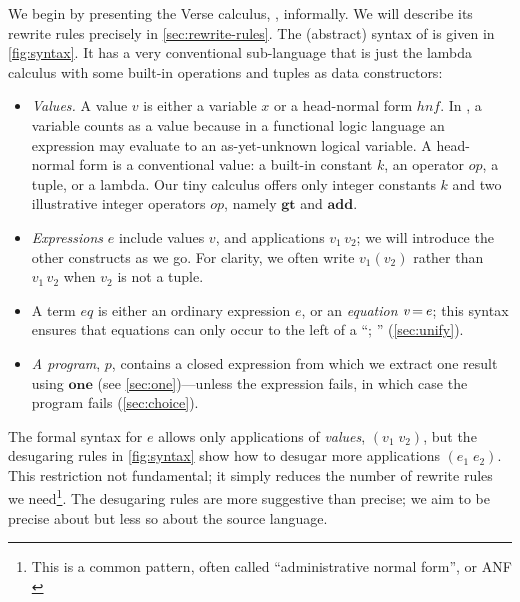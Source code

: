 \documentclass[acmsmall]{acmart}
\newcommand{\Varid}[1]{\mathit{#1}}
\newcommand{\lennart}[1]{{\color{dkcyan} [{LA}: #1]}}
\newcommand{\lennart}[1]{}
\begin{document}
We begin by presenting the Verse calculus, \versecalc, informally.  We will describe its
rewrite rules precisely in \cref{sec:rewrite-rules}.
The (abstract) syntax of \versecalc{} is given in \cref{fig:syntax}.
It has a very conventional sub-language that is just the lambda calculus with
some built-in operations and tuples as data constructors:
\begin{itemize}
\item \emph{Values.}  A value \ensuremath{\Varid{v}} is either a variable \ensuremath{\Varid{x}} or a head-normal form \ensuremath{\mathit{hnf}}.
  In \versecalc{}, a variable counts as a value because in a functional logic language an expression
  may evaluate to an as-yet-unknown logical variable.
  A head-normal form is a conventional value: a built-in constant \ensuremath{\Varid{k}}, an operator \ensuremath{\Varid{op}}, a tuple, or
  a lambda.  Our tiny calculus offers only integer constants \ensuremath{\Varid{k}} and two illustrative integer operators \ensuremath{\Varid{op}}, namely \ensuremath{\textbf{gt}} and \ensuremath{\textbf{add}}.
\item \emph{Expressions} \ensuremath{\Varid{e}} include values \ensuremath{\Varid{v}}, and applications \ensuremath{\Varid{v}_{\mathrm{1}}\,\Varid{v}_{\mathrm{2}}}; we will
  introduce the other constructs as we go.
For clarity, we often write \ensuremath{\Varid{v}_{\mathrm{1}}(\Varid{v}_{\mathrm{2}})} rather than \ensuremath{\Varid{v}_{\mathrm{1}}\,\Varid{v}_{\mathrm{2}}} when \ensuremath{\Varid{v}_{\mathrm{2}}} is not a tuple.
\item A term \ensuremath{eq} is either an ordinary expression \ensuremath{\Varid{e}}, or
an \emph{equation} \ensuremath{\Varid{v}\hspace{-0.14em}=\hspace{-0.14em}\Varid{e}}; this syntax ensures that equations can only occur to the left of a ``\ensuremath{;\,}'' (\cref{sec:unify}).
\item \emph{A program}, \ensuremath{\Varid{p}}, contains a closed expression from which we extract one result
  using \ensuremath{\textbf{one}} (see \cref{sec:one})---unless the expression fails, in which case the program fails (\cref{sec:choice}).
\end{itemize}
The formal syntax for \ensuremath{\Varid{e}} allows only applications of \emph{values}, \ensuremath{(\Varid{v}_{\mathrm{1}}\;\Varid{v}_{\mathrm{2}})}, but the desugaring
rules in \cref{fig:syntax} show how to desugar more applications \ensuremath{(\Varid{e}_{\mathrm{1}}\;\Varid{e}_{\mathrm{2}})}. This restriction
not fundamental; it simply reduces the number of rewrite rules we need\footnote{
This is a common pattern, often called
  ``administrative normal form'', or ANF \cite{felleisen:anf}}.
The desugaring rules are more suggestive than precise; we aim to be precise about \versecalc{} but
less so about the source language.
\end{document}
